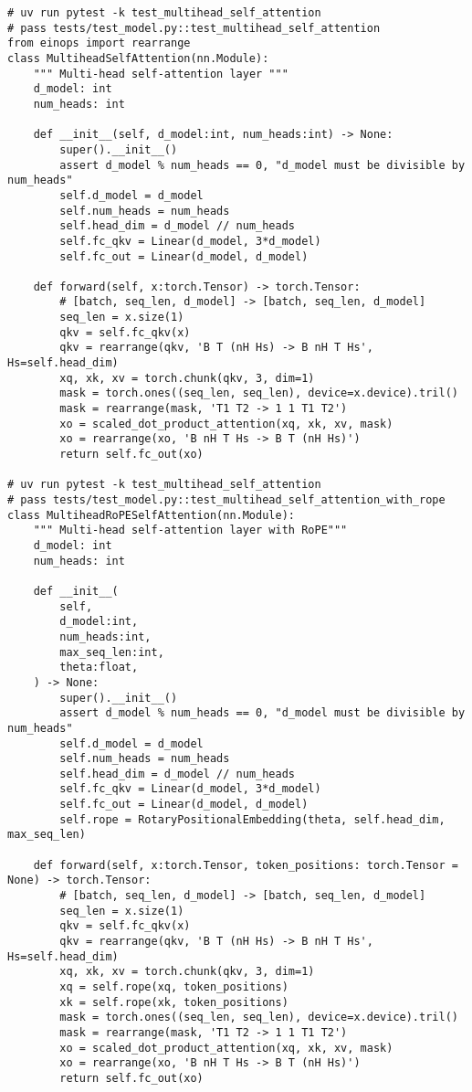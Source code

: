 \begin{lstlisting}
# uv run pytest -k test_multihead_self_attention
# pass tests/test_model.py::test_multihead_self_attention
from einops import rearrange
class MultiheadSelfAttention(nn.Module):
    """ Multi-head self-attention layer """
    d_model: int
    num_heads: int
    
    def __init__(self, d_model:int, num_heads:int) -> None:
        super().__init__()
        assert d_model % num_heads == 0, "d_model must be divisible by num_heads"
        self.d_model = d_model
        self.num_heads = num_heads
        self.head_dim = d_model // num_heads
        self.fc_qkv = Linear(d_model, 3*d_model)
        self.fc_out = Linear(d_model, d_model)
    
    def forward(self, x:torch.Tensor) -> torch.Tensor:
        # [batch, seq_len, d_model] -> [batch, seq_len, d_model]
        seq_len = x.size(1)
        qkv = self.fc_qkv(x)
        qkv = rearrange(qkv, 'B T (nH Hs) -> B nH T Hs', Hs=self.head_dim)
        xq, xk, xv = torch.chunk(qkv, 3, dim=1)
        mask = torch.ones((seq_len, seq_len), device=x.device).tril()
        mask = rearrange(mask, 'T1 T2 -> 1 1 T1 T2')
        xo = scaled_dot_product_attention(xq, xk, xv, mask)
        xo = rearrange(xo, 'B nH T Hs -> B T (nH Hs)')
        return self.fc_out(xo)

# uv run pytest -k test_multihead_self_attention
# pass tests/test_model.py::test_multihead_self_attention_with_rope
class MultiheadRoPESelfAttention(nn.Module):
    """ Multi-head self-attention layer with RoPE"""
    d_model: int
    num_heads: int
    
    def __init__(
        self, 
        d_model:int, 
        num_heads:int,
        max_seq_len:int,
        theta:float,
    ) -> None:
        super().__init__()
        assert d_model % num_heads == 0, "d_model must be divisible by num_heads"
        self.d_model = d_model
        self.num_heads = num_heads
        self.head_dim = d_model // num_heads
        self.fc_qkv = Linear(d_model, 3*d_model)
        self.fc_out = Linear(d_model, d_model)
        self.rope = RotaryPositionalEmbedding(theta, self.head_dim, max_seq_len)
    
    def forward(self, x:torch.Tensor, token_positions: torch.Tensor = None) -> torch.Tensor:
        # [batch, seq_len, d_model] -> [batch, seq_len, d_model]
        seq_len = x.size(1)
        qkv = self.fc_qkv(x)
        qkv = rearrange(qkv, 'B T (nH Hs) -> B nH T Hs', Hs=self.head_dim)
        xq, xk, xv = torch.chunk(qkv, 3, dim=1)
        xq = self.rope(xq, token_positions)
        xk = self.rope(xk, token_positions)
        mask = torch.ones((seq_len, seq_len), device=x.device).tril()
        mask = rearrange(mask, 'T1 T2 -> 1 1 T1 T2')
        xo = scaled_dot_product_attention(xq, xk, xv, mask)
        xo = rearrange(xo, 'B nH T Hs -> B T (nH Hs)')
        return self.fc_out(xo)
\end{lstlisting}


